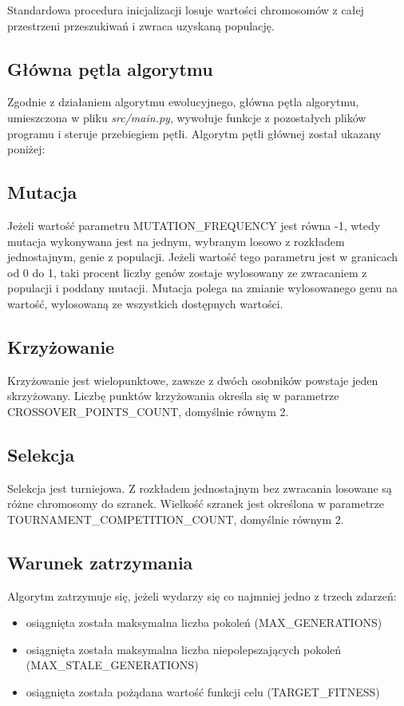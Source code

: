 Standardowa procedura inicjalizacji losuje wartości chromosomów z całej przestrzeni przeszukiwań i zwraca uzyskaną populację.

\subsection{Główna pętla algorytmu}
\label{section:mainloop}

Zgodnie z działaniem algorytmu ewolucyjnego, główna pętla algorytmu, umieszczona w pliku \textit{src/main.py}, wywołuje funkcje z pozostałych plików programu i steruje przebiegiem pętli. Algorytm pętli głównej został ukazany poniżej:


\subsection{Mutacja}

Jeżeli wartość parametru MUTATION\_FREQUENCY jest równa -1, wtedy mutacja wykonywana jest na jednym, wybranym losowo z rozkładem jednostajnym, genie z populacji. Jeżeli wartość tego parametru jest w granicach od 0 do 1, taki procent liczby genów zostaje wylosowany ze zwracaniem z populacji i poddany mutacji. Mutacja polega na zmianie wylosowanego genu na wartość, wylosowaną ze wszystkich dostępnych wartości.

\subsection{Krzyżowanie}

Krzyżowanie jest wielopunktowe, zawsze z dwóch osobników powstaje jeden skrzyżowany. Liczbę punktów krzyżowania określa się w parametrze CROSSOVER\_POINTS\_COUNT, domyślnie równym 2.

\subsection{Selekcja}

Selekcja jest turniejowa. Z rozkładem jednostajnym bez zwracania losowane są różne chromosomy do szranek. Wielkość szranek jest określona w parametrze TOURNAMENT\_COMPETITION\_COUNT, domyślnie równym 2.

\subsection{Warunek zatrzymania}

Algorytm zatrzymuje się, jeżeli wydarzy się co najmniej jedno z trzech zdarzeń:
\begin{itemize}
    \item osiągnięta została maksymalna liczba pokoleń (MAX\_GENERATIONS)
    \item osiągnięta została maksymalna liczba niepolepszających pokoleń (MAX\_STALE\_GENERATIONS)
    \item osiągnięta została pożądana wartość funkcji celu (TARGET\_FITNESS)
\end{itemize}


